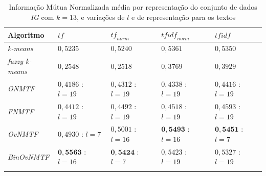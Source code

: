 \documentclass[
    12pt,                %
    oneside,            %
    a4paper,            %
    english,            %
    brazil                %
    ]{abntex2ppgsi}
\begin{document}
\begin{table}[H]
\centering
    \caption{Informação Mútua Normalizada média por representação do conjunto de dados \textit{IG} com $k = 13$, e variações de $l$ e de representação para os textos}
    \begin{tabular}{lllll}
        \hline
        \textbf{Algoritmo} & $\textit{tf}$ & $\textit{tf}_{norm}$ & $\textit{tfidf}_{norm}$ & $\textit{tfidf}$ \\
        \hline
        \textit{k-means}       & $0,5235$            & $0,5240$            & $0,5361$            & $0,5350$ \\
        \textit{fuzzy k-means} & $0,2548$            & $0,2518$            & $0,3769$            & $0,3929$ \\
        \textit{ONMTF}         & $0,4186$ : $l = 19$ & $0,4312$ : $l = 19$ & $0,4338$ : $l = 19$ & $0,4416$ : $l = 19$ \\
        \textit{FNMTF}         & $0,4412$ : $l = 19$ & $0,4492$ : $l = 19$ & $0,4518$ : $l = 19$ & $0,4593$ : $l = 19$ \\
        \textit{OvNMTF}        & $0,4930$ : $l = 7$  & $0,5001$ : $l = 16$ & $\mathbf{0,5493}$ : $l = 16$ & $\mathbf{0,5451}$ : $l = 7$ \\
        \textit{BinOvNMTF}     & $\mathbf{0,5563}$ : $l = 16$ & $\mathbf{0,5424}$ : $l = 7$  & $0,5423$ : $l = 19$ & $0,5327$ : $l = 19$ \\
        \hline \\
    \end{tabular}
    \label{tab:experiments-quant-nmi:nips}
\end{table}
\end{document}
